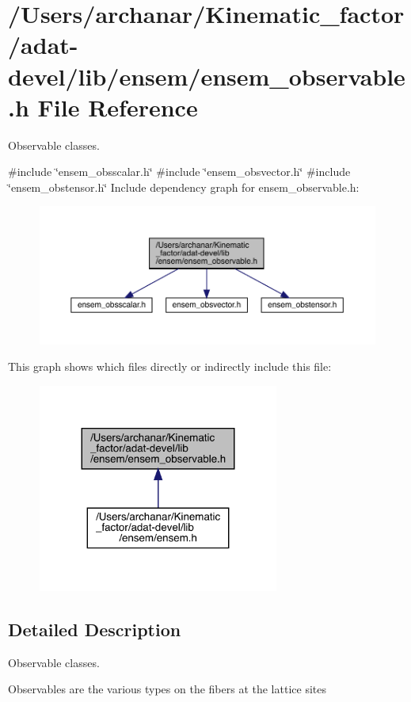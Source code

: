 \hypertarget{adat-devel_2lib_2ensem_2ensem__observable_8h}{}\section{/\+Users/archanar/\+Kinematic\+\_\+factor/adat-\/devel/lib/ensem/ensem\+\_\+observable.h File Reference}
\label{adat-devel_2lib_2ensem_2ensem__observable_8h}


Observable classes.  


{\ttfamily \#include \char`\"{}ensem\+\_\+obsscalar.\+h\char`\"{}}\newline
{\ttfamily \#include \char`\"{}ensem\+\_\+obsvector.\+h\char`\"{}}\newline
{\ttfamily \#include \char`\"{}ensem\+\_\+obstensor.\+h\char`\"{}}\newline
Include dependency graph for ensem\+\_\+observable.\+h\+:
\nopagebreak
\begin{figure}[H]
\begin{center}
\leavevmode
\includegraphics[width=350pt]{dd/deb/adat-devel_2lib_2ensem_2ensem__observable_8h__incl}
\end{center}
\end{figure}
This graph shows which files directly or indirectly include this file\+:
\nopagebreak
\begin{figure}[H]
\begin{center}
\leavevmode
\includegraphics[width=224pt]{de/d7a/adat-devel_2lib_2ensem_2ensem__observable_8h__dep__incl}
\end{center}
\end{figure}


\subsection{Detailed Description}
Observable classes. 

Observables are the various types on the fibers at the lattice sites 